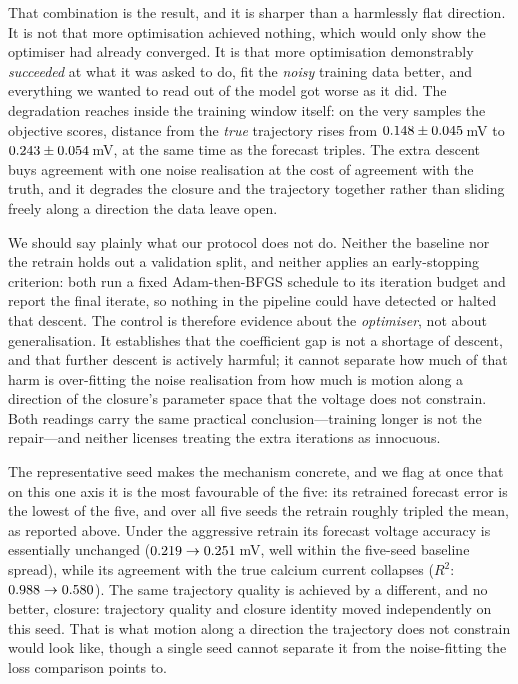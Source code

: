 \documentclass{article}
\begin{document}
That combination is the result, and it is sharper than a harmlessly flat
direction. It is not that more optimisation achieved nothing, which would only
show the optimiser had already converged. It is that more optimisation
demonstrably \emph{succeeded} at what it was asked to do, fit the \emph{noisy}
training data better, and everything we wanted to read out of the model got worse
as it did. The degradation reaches inside the training window itself: on the very
samples the objective scores, distance from the \emph{true} trajectory rises from
$0.148 \pm 0.045$\,mV to $0.243 \pm 0.054$\,mV, at the same
time as the forecast triples. The extra descent buys agreement with one noise
realisation at the cost of agreement with the truth, and it degrades the closure
and the trajectory together rather than sliding freely along a direction the data
leave open.

We should say plainly what our protocol does not do. Neither the baseline nor the
retrain holds out a validation split, and neither applies an early-stopping
criterion: both run a fixed Adam-then-BFGS schedule to its iteration budget and
report the final iterate, so nothing in the pipeline could have detected or
halted that descent. The control is therefore evidence about the
\emph{optimiser}, not about generalisation. It establishes that the coefficient
gap is not a shortage of descent, and that further descent is actively harmful;
it cannot separate how much of that harm is over-fitting the noise realisation
from how much is motion along a direction of the closure's parameter space that
the voltage does not constrain. Both readings carry the same practical
conclusion---training longer is not the repair---and neither licenses treating
the extra iterations as innocuous.

The representative seed makes the mechanism concrete, and we flag at once that on
this one axis it is the most favourable of the five: its retrained forecast error
is the lowest of the five, and over all five seeds the retrain roughly tripled the
mean, as reported above. Under the aggressive
retrain its forecast voltage accuracy is essentially unchanged
($0.219 \to 0.251$\,mV, well
within the five-seed baseline spread), while its agreement with the true calcium
current collapses
($R^2$: $0.988 \to 0.580$). The
same trajectory quality is achieved by a different, and no better, closure:
trajectory quality and closure identity moved independently on this seed. That is
what motion along a direction the trajectory does not constrain would look like,
though a single seed cannot separate it from the noise-fitting the loss
comparison points to.
\end{document}
